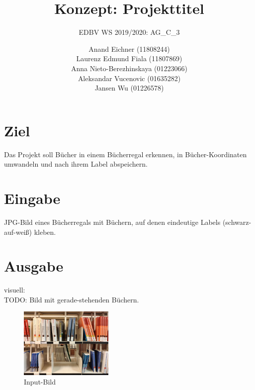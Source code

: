 \documentclass[deutsch]{scrartcl}
\begin{document}
\title{Konzept: Projekttitel} %

\subtitle{EDBV WS 2019/2020: AG\_C\_3} %


\author{Anand Eichner (11808244)\\
Laurenz Edmund Fiala (11807869)\\
Anna Nieto-Berezhinskaya (01223066)\\
Aleksandar Vucenovic (01635282)\\
Jansen Wu (01226578)}




\maketitle



\section{Ziel}
Das Projekt soll Bücher in einem Bücherregal erkennen, in Bücher-Koordinaten umwandeln und nach ihrem Label abspeichern.

\section{Eingabe}
JPG-Bild eines Bücherregals mit Büchern, auf denen eindeutige Labels (schwarz-auf-weiß) kleben.

\section{Ausgabe}
visuell:\\
TODO: Bild mit gerade-stehenden Büchern.
\\
\begin{figure}[H]
 \centering
 \includegraphics[width=0.4\textwidth]{input.jpg}
 \caption{Input-Bild}
 \label{fig:img}
\end{figure}
\end{document}
